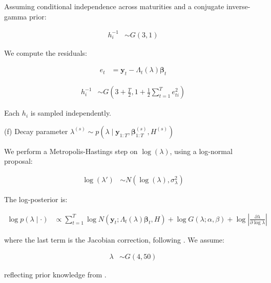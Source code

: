 Assuming conditional independence across maturities and a conjugate inverse-gamma prior:

\begin{align*}
h_i^{-1} &\sim G(3, 1)
\end{align*}

We compute the residuals:

\begin{align*}
e_t &= \mathbf{y}_t - \Lambda_t(\lambda) \mathbf{\beta}_t
\end{align*}

\begin{align*}
h_i^{-1} &\sim G\left(3 + \frac{T}{2}, 1 + \frac{1}{2} \sum_{t=1}^{T} e_{ti}^2\right)
\end{align*}

Each $h_i$ is sampled independently.

(f) Decay parameter $\lambda^{(s)} \sim p(\lambda \mid \mathbf{y}_{1:T}, \mathbf{\beta}_{1:T}^{(s)}, H^{(s)})$

We perform a Metropolis-Hastings step on $\log(\lambda)$, using a log-normal proposal:

\begin{align*}
\log(\lambda') &\sim N(\log(\lambda), \sigma_\lambda^2)
\end{align*}

The log-posterior is:

\begin{align*}
\log p(\lambda \mid \cdot) &\propto \sum_{t=1}^{T} \log N(\mathbf{y}_t; \Lambda_t(\lambda) \mathbf{\beta}_t, H) + \log G(\lambda; \alpha, \beta) + \log \left| \frac{\partial \lambda}{\partial \log \lambda} \right|
\end{align*}

where the last term is the Jacobian correction, following \cite{koop2010}. We assume:

\begin{align*}
\lambda &\sim G(4, 50)
\end{align*}

reflecting prior knowledge from \citet{diebold2006macroeconomy}.
